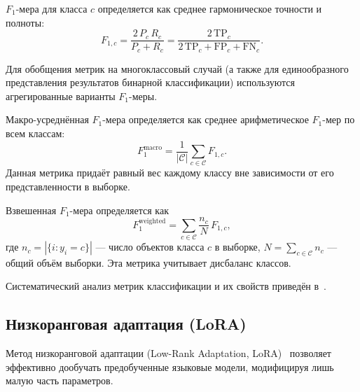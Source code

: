 \begin{definition}[$F_1$-мера]
\label{def:f1}
$F_1$-мера для класса $c$ определяется как среднее гармоническое точности
и полноты:
\begin{equation}
    F_{1,c} = \frac{2\,P_c\,R_c}{P_c + R_c}
            = \frac{2\,\mathrm{TP}_c}{2\,\mathrm{TP}_c + \mathrm{FP}_c + \mathrm{FN}_c}.
    \label{eq:f1}
\end{equation}
\end{definition}

Для обобщения метрик на многоклассовый случай (а также для единообразного
представления результатов бинарной классификации) используются агрегированные
варианты $F_1$-меры.

\begin{definition}[Macro $F_1$]
\label{def:macro-f1}
Макро-усреднённая $F_1$-мера определяется как среднее арифметическое
$F_1$-мер по всем классам:
\begin{equation}
    F_1^{\mathrm{macro}} = \frac{1}{|\mathcal{C}|}
        \sum_{c \in \mathcal{C}} F_{1,c}.
    \label{eq:macro-f1}
\end{equation}
Данная метрика придаёт равный вес каждому классу вне зависимости от его
представленности в выборке.
\end{definition}

\begin{definition}[Weighted $F_1$]
\label{def:weighted-f1}
Взвешенная $F_1$-мера определяется как
\begin{equation}
    F_1^{\mathrm{weighted}} = \sum_{c \in \mathcal{C}}
        \frac{n_c}{N}\,F_{1,c},
    \label{eq:weighted-f1}
\end{equation}
где $n_c = |\{i : y_i = c\}|$ --- число объектов класса $c$ в выборке,
$N = \sum_{c \in \mathcal{C}} n_c$ --- общий объём выборки.
Эта метрика учитывает дисбаланс классов.
\end{definition}

Систематический анализ метрик классификации и их свойств приведён
в~\cite{sokolova2009systematic}.


\subsection{Низкоранговая адаптация (LoRA)}
\label{subsec:lora}

Метод низкоранговой адаптации (Low-Rank Adaptation, LoRA)~\cite{hu2022lora}
позволяет эффективно дообучать предобученные языковые модели, модифицируя лишь
малую часть параметров.

